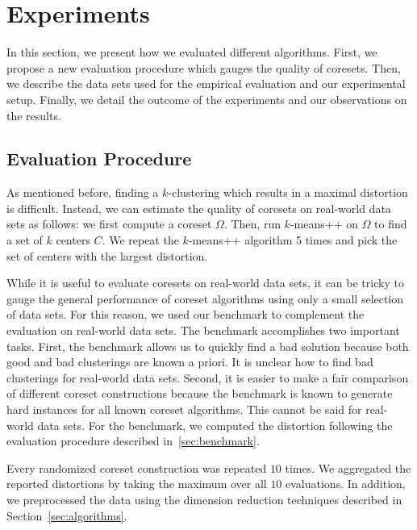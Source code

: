 


\section{Experiments} \label{sec:experiments}
In this section, we present how we evaluated different algorithms. First, we propose a new evaluation procedure which gauges the quality of coresets. Then, we describe the data sets used for the empirical evaluation and our experimental setup. Finally, we detail the outcome of the experiments and our observations on the results.

\subsection{Evaluation Procedure}
As mentioned before, finding a $k$-clustering which results in a maximal distortion is difficult. Instead, we can estimate the quality of coresets on real-world data sets as follows: we first compute a coreset $\Omega$. Then, run $k$-means++ on $\Omega$ to find a set of $k$ centers $C$. We repeat the $k$-means++ algorithm 5 times and pick the set of centers with the largest distortion.

While it is useful to evaluate coresets on real-world data sets, it can be tricky to gauge the general performance of coreset algorithms using only a small selection of data sets. For this reason, we used our benchmark to complement the evaluation on real-world data sets. The benchmark accomplishes two important tasks. First, the benchmark allows us to quickly find a bad solution because both good and bad clusterings are known a priori. It is unclear how to find bad clusterings for real-world data sets. Second, it is easier to make a fair comparison of different coreset constructions because the benchmark is known to generate hard instances for all known coreset algorithms. This cannot be said for real-world data sets. For the benchmark, we computed the distortion following the evaluation procedure described in~\cref{sec:benchmark}. 


Every randomized coreset construction was repeated $10$ times. We aggregated the reported distortions by taking the maximum over all $10$ evaluations. 
In addition, we preprocessed the data using the dimension reduction techniques described in Section~\ref{sec:algorithms}.



